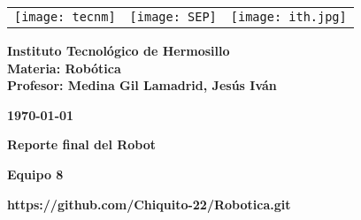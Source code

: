 \begin{titlepage}
	\centering
	\begin{tabular}{@{}p{} p{} p{}@{}}
		\texttt{[image: tecnm]} & 
		\centering \texttt{[image: SEP]} & 
		\raggedleft \texttt{[image: ith.jpg]} \\
	\end{tabular}
	
	\vspace{2em}
	
	\noindent
	\begin{minipage}[t]{0.6\textwidth}
		\raggedright
		\small \textbf{%
			Instituto Tecnológico de Hermosillo\\
			Materia: Robótica\\
			Profesor: Medina Gil Lamadrid, Jesús Iván%
		}
	\end{minipage}%
	\hfill
	\begin{minipage}[t]{0.3\textwidth}
		\raggedleft
		\small \textbf{\today}
	\end{minipage}
	
	\vspace{2em}
	
	{\Huge \textbf{Reporte final del Robot}}
		
	\vspace{1em}
	
	\begin{center}
		{\Large \textbf{Equipo 8}}
		
		{\small \textbf{https://github.com/Chiquito-22/Robotica.git}}
	\end{center}
	
	\vspace{1em}
	

\end{titlepage}
